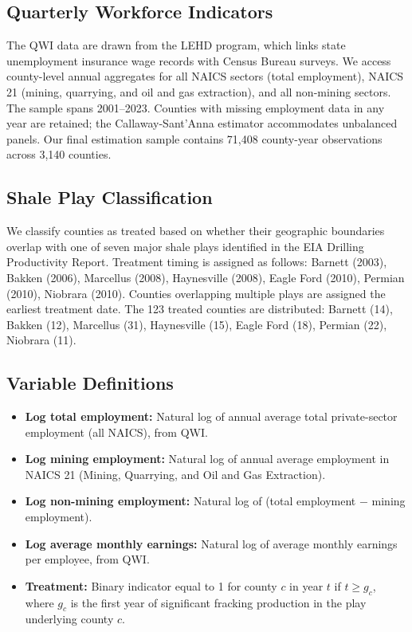 \documentclass[12pt]{article}
\begin{document}
\subsection{Quarterly Workforce Indicators}

The QWI data are drawn from the LEHD program, which links state unemployment insurance wage records with Census Bureau surveys. We access county-level annual aggregates for all NAICS sectors (total employment), NAICS 21 (mining, quarrying, and oil and gas extraction), and all non-mining sectors. The sample spans 2001--2023. Counties with missing employment data in any year are retained; the Callaway-Sant'Anna estimator accommodates unbalanced panels. Our final estimation sample contains 71,408 county-year observations across 3,140 counties.

\subsection{Shale Play Classification}

We classify counties as treated based on whether their geographic boundaries overlap with one of seven major shale plays identified in the EIA Drilling Productivity Report. Treatment timing is assigned as follows: Barnett (2003), Bakken (2006), Marcellus (2008), Haynesville (2008), Eagle Ford (2010), Permian (2010), Niobrara (2010). Counties overlapping multiple plays are assigned the earliest treatment date. The 123 treated counties are distributed: Barnett (14), Bakken (12), Marcellus (31), Haynesville (15), Eagle Ford (18), Permian (22), Niobrara (11).

\subsection{Variable Definitions}

\begin{itemize}
\item \textbf{Log total employment:} Natural log of annual average total private-sector employment (all NAICS), from QWI.
\item \textbf{Log mining employment:} Natural log of annual average employment in NAICS 21 (Mining, Quarrying, and Oil and Gas Extraction).
\item \textbf{Log non-mining employment:} Natural log of (total employment $-$ mining employment).
\item \textbf{Log average monthly earnings:} Natural log of average monthly earnings per employee, from QWI.
\item \textbf{Treatment:} Binary indicator equal to 1 for county $c$ in year $t$ if $t \geq g_c$, where $g_c$ is the first year of significant fracking production in the play underlying county $c$.
\end{itemize}
\end{document}
